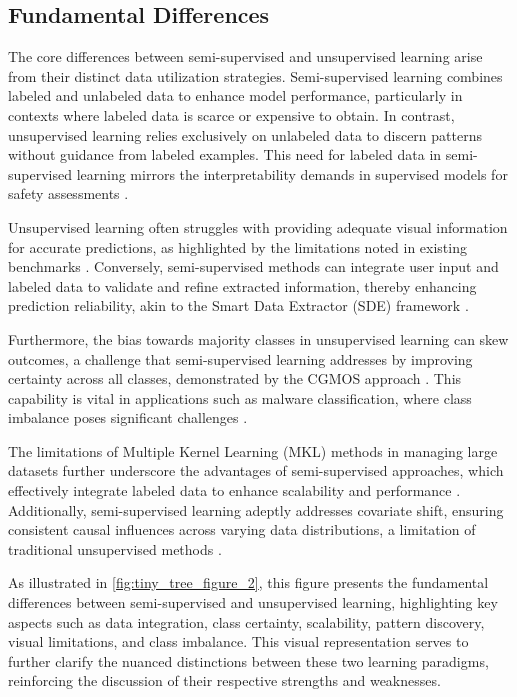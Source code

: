 \subsection{Fundamental Differences} \label{subsec:Fundamental Differences}

The core differences between semi-supervised and unsupervised learning arise from their distinct data utilization strategies. Semi-supervised learning combines labeled and unlabeled data to enhance model performance, particularly in contexts where labeled data is scarce or expensive to obtain. In contrast, unsupervised learning relies exclusively on unlabeled data to discern patterns without guidance from labeled examples. This need for labeled data in semi-supervised learning mirrors the interpretability demands in supervised models for safety assessments \cite{wei2022safetyinterpretablemachinelearning}.

Unsupervised learning often struggles with providing adequate visual information for accurate predictions, as highlighted by the limitations noted in existing benchmarks \cite{deboer2023progressactivityprogressprediction}. Conversely, semi-supervised methods can integrate user input and labeled data to validate and refine extracted information, thereby enhancing prediction reliability, akin to the Smart Data Extractor (SDE) framework \cite{quennelle2023smartdataextractorclinician}. 

Furthermore, the bias towards majority classes in unsupervised learning can skew outcomes, a challenge that semi-supervised learning addresses by improving certainty across all classes, demonstrated by the CGMOS approach \cite{zhang2016cgmoscertaintyguidedminority}. This capability is vital in applications such as malware classification, where class imbalance poses significant challenges \cite{m2023comparativeanalysisimbalancedmalware}.

The limitations of Multiple Kernel Learning (MKL) methods in managing large datasets further underscore the advantages of semi-supervised approaches, which effectively integrate labeled data to enhance scalability and performance \cite{moeller2014geometricalgorithmscalablemultiple}. Additionally, semi-supervised learning adeptly addresses covariate shift, ensuring consistent causal influences across varying data distributions, a limitation of traditional unsupervised methods \cite{sen2018supervisingfeatureinfluence}.

As illustrated in \autoref{fig:tiny_tree_figure_2}, this figure presents the fundamental differences between semi-supervised and unsupervised learning, highlighting key aspects such as data integration, class certainty, scalability, pattern discovery, visual limitations, and class imbalance. This visual representation serves to further clarify the nuanced distinctions between these two learning paradigms, reinforcing the discussion of their respective strengths and weaknesses.

